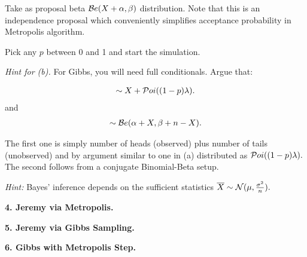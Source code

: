 \documentclass[12pt]{article}
\newcommand{\ba}{\begin{eqnarray*}}
\newcommand{\ea}{\end{eqnarray*}}
\begin{document}
 Take as proposal   beta ${\cal  B}e(X+\alpha, \beta)$ distribution.
 Note that this is an independence proposal which conveniently
 simplifies acceptance probability in Metropolis algorithm.

 Pick any $p$ between 0 and 1 and start the simulation.

 \vspace*{0.1in}

 {\sl Hint for (b).}  For Gibbs, you will need full conditionals.
 Argue that:

 \ba
 [ n | X, p ]   \sim    X + {\cal P}oi( (1-p)\lambda ).
\ea
and
\ba
 [ p | n, X ]   \sim  {\cal B}e(\alpha + X, \beta + n - X).
\ea

 The first one is simply number of heads (observed) plus number of
 tails (unobserved) and by argument similar to one in (a)
 distributed as ${\cal P}oi( (1-p)\lambda ) .$ The second follows
 from a conjugate Binomial-Beta setup.


\vspace*{0.3in}


{\sl Hint:} Bayes' inference depends on the sufficient statistics $\overline{X} \sim {\cal N}(\mu, \frac{\sigma^2}{n}).$

\vspace{0.3in} \noindent
{\bf  4. Jeremy via Metropolis.~}

\vspace{0.3in} \noindent
{\bf 5. Jeremy via Gibbs Sampling.~}

\vspace{0.3in} \noindent
{\bf 6. Gibbs with Metropolis Step.~}
\end{document}
